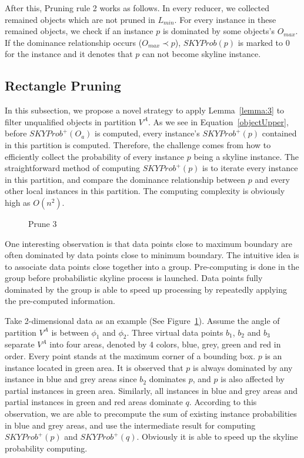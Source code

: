 After this, Pruning rule 2 works as follows. In every reducer, we collected remained objects which are not pruned in $L_{min}$. For every instance in these remained objects, we check if an instance $p$ is dominated by some objects's $O_{max}$. If the dominance relationship occurs ($O_{max} \prec p$), $SKYProb(p)$ is marked to $0$ for the instance and it denotes that $p$ can not become skyline instance.

\subsection{Rectangle Pruning}
\label{secondPhase}
In this subsection, we propose a novel strategy to apply Lemma~\ref{lemma:3} to filter unqualified objects in partition $V^A$. As we see in Equation~\ref{objectUpper}, before $SKYProb^{+}(O_a)$ is computed, every instance's $SKYProb^{+}(p)$ contained in this partition is computed. Therefore, the challenge comes from how to efficiently collect the probability of every instance $p$ being a skyline instance.
The straightforward method of computing $SKYProb^{+}(p)$ is to iterate every instance in this partition, and compare the dominance relationship between $p$ and every other local instances in this partition. The computing complexity is obviously high as $O(n^2)$.

\begin{figure}[t]
\vspace{-15pt}
\centering
  \centerline{}
  \caption{Prune 3}
  \vspace{-15pt}
  \label{figure:rect}
\end{figure}

One interesting observation is that data points close to maximum boundary are often dominated by data points close to minimum boundary. The intuitive idea is to associate data points close together into a group. Pre-computing is done in the group before probabilistic skyline process is launched. Data points fully dominated by the group is able to speed up processing by repeatedly applying the pre-computed information.

Take 2-dimensional data as an example (See Figure~\ref{figure:rect}). Assume the angle of partition $V^A$ is between $\phi_1$ and $\phi_2$. Three virtual data points $b_1$, $b_2$ and $b_3$ separate $V^A$ into four areas, denoted by 4 colors, blue, grey, green and red in order. Every point stands at the maximum corner of a bounding box. $p$ is an instance located in green area. It is observed that $p$ is always dominated by any instance in blue and grey areas since $b_2$ dominates $p$, and $p$ is also affected by partial instances in green area. Similarly, all instances in blue and grey areas and partial instances in green and red areas dominate $q$. According to this observation, we are able to precompute the sum of existing instance probabilities in blue and grey areas, and use the intermediate result for computing $SKYProb^{+}(p)$ and $SKYProb^{+}(q)$. Obviously it is able to speed up the skyline probability computing. 

